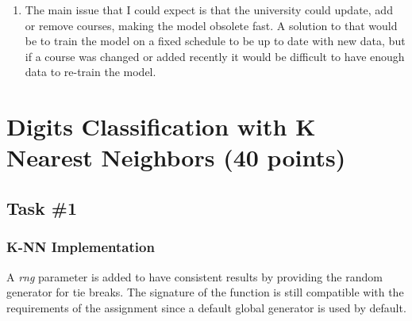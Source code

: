 \documentclass[a4paper,12pt]{article}
\DeclareMathOperator*{\argmin}{arg\,min}
\begin{document}
\begin{enumerate}
\begin{enumerate}
            \item Take the first part of my dataset $\mathcal{S}_1$ to train the model and get a
                hypothesis class $\mathcal H = \{ h_i: \mathcal{X} \rightarrow \mathcal{Y} \}$
                for $i = 1, \dots, M$.
            \item Take the second part of my dataset $\mathcal{S}_2(|\mathcal{S}_2| = N)$
                to select the hypothesis with the lowest average error.
                $$
                \begin{aligned}
                r_i &= \mathcal{R}_{S_2}(h_i) = \frac{1}{N} \sum_{j=1}^{N} \ell(y_j, h_i(x_j)) & \forall\, i = 1, \dots, M \\
                h_{i^*} &\in \mathcal{H} \text{ with } i^* = \argmin_{i} r_i &
                \end{aligned}
                $$
            \item Take the third and final part of my dataset $\mathcal{S}_3$ to evaluate the selected
                hypothesis $h_{i^*}$ by seeing the average error on new and unbiased data.
        \end{enumerate}
    \item The main issue that I could expect is that the university could update,
        add or remove courses, making the model obsolete fast. A solution to that
        would be to train the model on a fixed schedule to be up to date with new
        data, but if a course was changed or added recently it would be difficult
        to have enough data to re-train the model.
\end{enumerate}

\section{Digits Classification with K Nearest Neighbors (40 points)}

\subsection{Task \#1}

\subsubsection{K-NN Implementation}

A \emph{rng} parameter is added to have consistent results by providing
the random generator for tie breaks. The signature of the function is
still compatible with the requirements of the assignment since a default global
generator is used by default.
\end{document}
